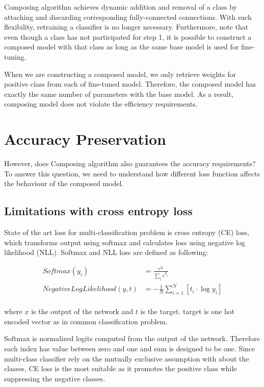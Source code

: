 \documentclass{article}
\begin{document}
Composing algorithm achieves dynamic addition and removal of a class by attaching and discarding corresponding fully-connected connections.
With such flexibility, retraining a classifier is no longer necessary. Furthermore, note that even though a class has not participated for step 1, it is possible to construct a composed model with that class as long as the same base model is used for fine-tuning.

When we are constructing a composed model, we only retrieve weights for positive class from each of fine-tuned model. Therefore, the composed model has exactly the same number of parameters with the base model. As a result, composing model does not violate the efficiency requirements.

\section{Accuracy Preservation}

However, does Composing algorithm also guarantees the accuracy requirements? To answer this question, we need to understand how different loss function affects the behaviour of the composed model.

\subsection{Limitations with cross entropy loss}

State of the art loss for multi-classification problem is cross entropy (CE) loss, which transforms output using softmax and calculates loss using negative log likelihood (NLL).
Softmax and NLL loss are defined as following:

\begin{align*}
Softmax(y_i) &= \frac{e^{y_i}}{\sum_{j}e^{y_j}} \\
NegativeLogLikelihood(y, t) & = -\frac{1}{N}\sum_{i=1}^N \left[ t_i \cdot \log y_i\right] \\
\end{align*}

where $x$ is the output of the network and $t$ is the target. target is one hot encoded vector as in common classification problem.

Softmax is normalized logits computed from the output of the network. Therefore each index has value between zero and one and sum is designed to be one. Since multi-class classifier rely on the mutually exclusive assumption with about the classes, CE loss is the most suitable as it promotes the positive class while suppressing the negative classes.
\end{document}
